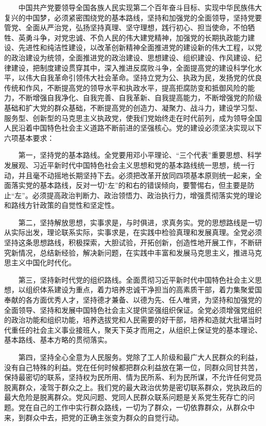 　　中国共产党要领导全国各族人民实现第二个百年奋斗目标、实现中华民族伟大复兴的中国梦，必须紧密围绕党的基本路线，坚持和加强党的全面领导，坚持党要管党、全面从严治党，弘扬坚持真理、坚守理想，践行初心、担当使命，不怕牺牲、英勇斗争，对党忠诚、不负人民的伟大建党精神，加强党的长期执政能力建设、先进性和纯洁性建设，以改革创新精神全面推进党的建设新的伟大工程，以党的政治建设为统领，全面推进党的政治建设、思想建设、组织建设、作风建设、纪律建设，把制度建设贯穿其中，深入推进反腐败斗争，全面提高党的建设科学化水平，以伟大自我革命引领伟大社会革命。坚持立党为公、执政为民，发扬党的优良传统和作风，不断提高党的领导水平和执政水平，提高拒腐防变和抵御风险的能力，不断增强自我净化、自我完善、自我革新、自我提高能力，不断增强党的阶级基础和扩大党的群众基础，不断提高党的创造力、凝聚力、战斗力，建设学习型、服务型、创新型的马克思主义执政党，使我们党始终走在时代前列，成为领导全国人民沿着中国特色社会主义道路不断前进的坚强核心。党的建设必须坚决实现以下六项基本要求：

　　第一，坚持党的基本路线。全党要用邓小平理论、“三个代表”重要思想、科学发展观、习近平新时代中国特色社会主义思想和党的基本路线统一思想，统一行动，并且毫不动摇地长期坚持下去。必须把改革开放同四项基本原则统一起来，全面落实党的基本路线，反对一切“左”的和右的错误倾向，要警惕右，但主要是防止“左”。必须提高政治判断力、政治领悟力、政治执行力，增强贯彻落实党的理论和路线方针政策的自觉性和坚定性。

　　第二，坚持解放思想，实事求是，与时俱进，求真务实。党的思想路线是一切从实际出发，理论联系实际，实事求是，在实践中检验真理和发展真理。全党必须坚持这条思想路线，积极探索，大胆试验，开拓创新，创造性地开展工作，不断研究新情况，总结新经验，解决新问题，在实践中丰富和发展马克思主义，推进马克思主义中国化时代化。

　　第三，坚持新时代党的组织路线。全面贯彻习近平新时代中国特色社会主义思想，以组织体系建设为重点，着力培养忠诚干净担当的高素质干部，着力集聚爱国奉献的各方面优秀人才，坚持德才兼备、以德为先、任人唯贤，为坚持和加强党的全面领导、坚持和发展中国特色社会主义提供坚强组织保证。全党必须增强党组织的政治功能和组织功能，培养选拔党和人民需要的好干部，培养和造就大批堪当时代重任的社会主义事业接班人，聚天下英才而用之，从组织上保证党的基本理论、基本路线、基本方略的贯彻落实。

　　第四，坚持全心全意为人民服务。党除了工人阶级和最广大人民群众的利益，没有自己特殊的利益。党在任何时候都把群众利益放在第一位，同群众同甘共苦，保持最密切的联系，坚持权为民所用、情为民所系、利为民所谋，不允许任何党员脱离群众，凌驾于群众之上。我们党的最大政治优势是密切联系群众，党执政后的最大危险是脱离群众。党风问题、党同人民群众联系问题是关系党生死存亡的问题。党在自己的工作中实行群众路线，一切为了群众，一切依靠群众，从群众中来，到群众中去，把党的正确主张变为群众的自觉行动。

